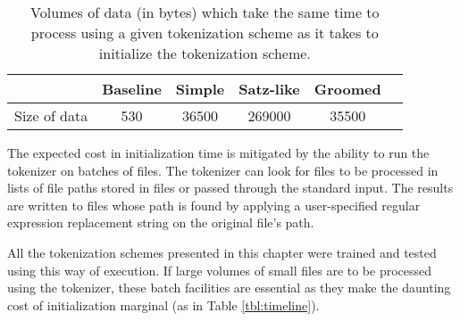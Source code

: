\begin{table}
  \begin{center}
    \begin{tabular}{ | l | c | c | c | c | c | }
      \hline
      & Baseline & Simple & Satz-like & Groomed \\ \hline
      Size of data & 530 & 36500 & 269000 & 35500 \\
      \hline
    \end{tabular}
  \end{center}
  \caption[Time spent initializing expressed as time spent processing data]
    {Volumes of data (in bytes) which take the same time to process using a
    given tokenization scheme as it takes to initialize the tokenization
    scheme.}
  \label{tbl:init-sizes}
\end{table}

The expected cost in initialization time is mitigated by the ability to run
the tokenizer on batches of files. The tokenizer can look for files to be
processed in lists of file paths stored in files or passed through the standard
input. The results are written to files whose path is found by applying a
user-specified regular expression replacement string on the original file's
path.

All the tokenization schemes presented in this chapter were trained and
tested using this way of execution. If large volumes of small files are to be
processed using the tokenizer, these batch facilities are essential as they
make the daunting cost of initialization marginal (as in Table
\ref{tbl:timeline}).
